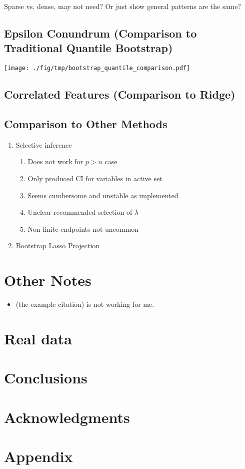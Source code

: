 Sparse vs. dense, may not need? Or just show general patterns are the same?

\subsection{Epsilon Conundrum (Comparison to Traditional Quantile Bootstrap)}
\texttt{[image: ./fig/tmp/bootstrap\_quantile\_comparison.pdf]}

\subsection{Correlated Features (Comparison to Ridge)}


\subsection{Comparison to Other Methods}

\begin{enumerate}
\item Selective inference
\begin{enumerate}
\item Does not work for $p > n$ case
\item Only produced CI for variables in active set
\item Seems cumbersome and unstable as implemented
\item Unclear recommended selection of $\lambda$
\item Non-finite endpoints not uncommon
\end{enumerate}
\item{Bootstrap Lasso Projection}
\end{enumerate}

\section{Other Notes}

\begin{itemize}
\item \cite{Tibshirani1996} (the example citation) is not working for me.
\end{itemize}

\section{Real data}

\section{Conclusions}

\section*{Acknowledgments}

\section*{Appendix}
